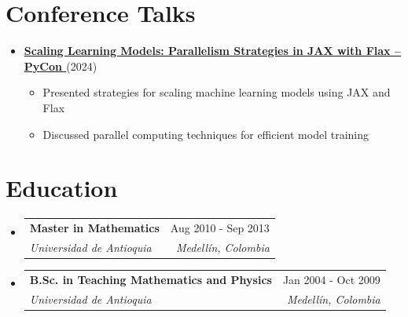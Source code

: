 \documentclass[letterpaper,11pt]{article}
\makeatletter
\newcommand{\resumeSubheading}[4]{
  \vspace{-2pt}
  \item[]
  \begin{tabular*}{\textwidth}{@{\extracolsep{\fill}}l r}
    \textbf{#1} & #2 \\
    \textit{#3} & \textit{#4} \\
  \end{tabular*}
  \vspace{-5pt}
}
\newcommand{\normalfaYoutube}{{\mdseries\faYoutube}}
\makeatother
\begin{document}
\section{Conference Talks}
\begin{itemize}[leftmargin=*]
    \item \textbf{\href{https://www.youtube.com/watch?v=m4hP1soE414}{Scaling Learning Models: Parallelism Strategies in JAX with Flax -- PyCon \normalfaYoutube}} (2024)
    \begin{itemize}[itemsep=0pt]
        \item Presented strategies for scaling machine learning models using JAX and Flax
        \item Discussed parallel computing techniques for efficient model training
    \end{itemize}
\end{itemize}

\section{Education}
\begin{itemize}[leftmargin=0pt, itemindent=0pt, label={}]
\resumeSubheading
{Master in Mathematics}{Aug 2010 - Sep 2013}
{Universidad de Antioquia}{Medellín, Colombia}

\resumeSubheading
{B.Sc. in Teaching Mathematics and Physics}{Jan 2004 - Oct 2009}
{Universidad de Antioquia}{Medellín, Colombia}

\end{itemize}
\end{document}
